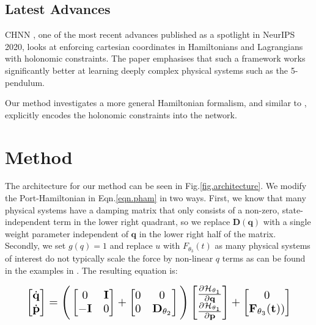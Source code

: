 \documentclass[twoside]{article}
\begin{document}
\subsection{Latest Advances}
CHNN \cite{finzi_generalizing_2020}, one of the most recent advances published as a spotlight in NeurIPS 2020, looks at enforcing cartesian coordinates in Hamiltonians and Lagrangians with holonomic constraints. The paper emphasises that such a framework works significantly better at learning deeply complex physical systems such as the 5-pendulum. 

Our method investigates a more general Hamiltonian formalism, and similar to \cite{finzi_generalizing_2020}, explicitly encodes the holonomic constraints into the network.

\section{Method}

The architecture for our method can be seen in Fig.\ref{fig.architecture}. We modify the Port-Hamiltonian in Eqn.\ref{eqn.pham} in two ways. First, we know that many physical systems have a damping matrix that only consists of a non-zero, state-independent term in the lower right quadrant, so we replace $\mathbf{D}(\mathbf{q})$ with a single weight parameter independent of $\mathbf{q}$ in the lower right half of the matrix. Secondly, we set $g(q)=1$ and replace $u$ with $F_{\theta_3}(t)$ as many physical systems of interest do not typically scale the force by non-linear $q$ terms as can be found in the examples in \cite{zhong_dissipative_2020}. The resulting equation is:

\begin{equation}
\resizebox{0.9\linewidth}{!}{$%
\begin{bmatrix}
\dot{\mathbf{q}} \\
\dot{\mathbf{p}}
\end{bmatrix}
=
\Bigg(\begin{bmatrix}
0 & \mathbf{I} \\
-\mathbf{I} & 0
\end{bmatrix} +
\begin{bmatrix}
0 & 0 \\
0 & \mathbf{D}_{\theta_2}
\end{bmatrix}
 \Bigg)
 \begin{bmatrix}
\frac{\partial \mathcal{H}_{\theta_1}}{\partial \mathbf{q}} \\
\frac{\partial \mathcal{H}_{\theta_1}}{\partial \mathbf{p}}
\end{bmatrix}
+
\begin{bmatrix}
0 \\
\mathbf{F}_{\theta_3}(\mathbf{t}))
\end{bmatrix}
$%
}%
\label{eqn.pham1}
\end{equation}
\end{document}

